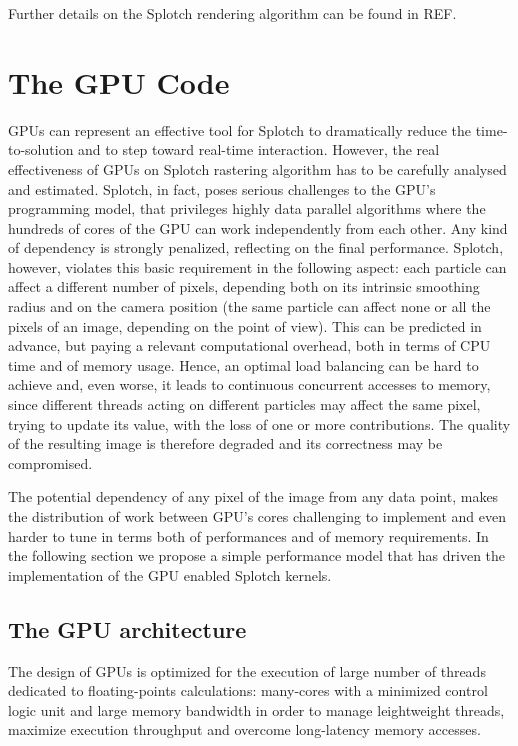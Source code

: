 \documentclass[11pt]{article}
\begin{document}
Further details on the Splotch rendering algorithm can be found in REF.

\section{The GPU Code}

GPUs can represent an effective tool for Splotch to dramatically 
reduce the time-to-solution and to step toward real-time interaction.
However, the real effectiveness of GPUs on Splotch rastering algorithm has to
be carefully analysed and estimated. Splotch, in fact, poses serious challenges 
to the GPU's programming model, that privileges highly data parallel algorithms 
where the hundreds of cores of the GPU can work independently from each other.
Any kind of dependency is strongly penalized, reflecting on the final performance.
Splotch, however, violates this basic requirement in the following aspect:
each particle can affect a different number of pixels, depending both on its intrinsic
smoothing radius and on the camera position (the same particle 
can affect none or all the pixels of an image, depending on the point of view). This 
can be predicted in advance, but paying a relevant computational overhead, both in terms
of CPU time and of memory usage. Hence, an optimal load balancing can be hard to achieve 
and, even worse, it leads to continuous concurrent accesses to memory, since
different threads acting on different particles may affect the same pixel, trying
to update its value, with the loss of one or more contributions.
The quality of the resulting image is therefore degraded and its correctness may be
compromised. 

The potential dependency of any pixel of the image from any data point,
makes the distribution of work between GPU's cores challenging to implement
and even harder to tune in terms both of performances and of memory requirements.
In the following section we propose a simple performance model that has
driven the implementation of the GPU enabled Splotch kernels.

\subsection{The GPU architecture}

The design of GPUs is optimized for the execution of large number of threads dedicated to floating-points calculations: 
many-cores with a minimized control logic unit and large memory bandwidth in order to manage leightweight threads, maximize execution throughput and overcome long-latency memory accesses. 
\end{document}
